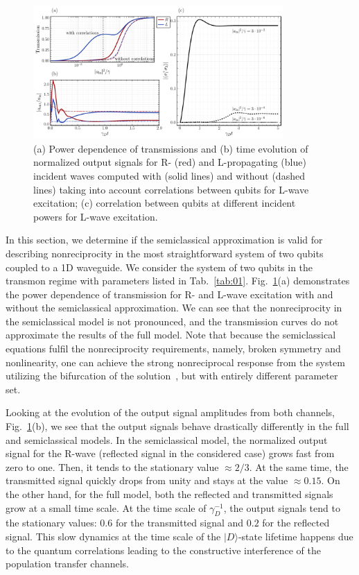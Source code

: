 \documentclass[lettersize,journal]{IEEEtran}
\begin{document}
\begin{figure}[t]
    \centering
    \includegraphics[width=0.85\textwidth]{fig_6}
    \caption{(a) Power dependence of transmissions and (b) time evolution of normalized output signals for R- (red) and L-propagating (blue) incident waves computed with (solid lines) and without (dashed lines) taking into account correlations between qubits for L-wave excitation; (c) correlation between qubits at different incident powers for L-wave excitation.}
    \label{fig:07}
\end{figure}
In this section, we determine if the semiclassical approximation is valid for describing nonreciprocity in the most straightforward system of two qubits coupled to a 1D waveguide.
We consider the system of two qubits in the transmon regime with parameters listed in Tab.~\ref{tab:01}.
Fig.~\ref{fig:07}(a) demonstrates the power dependence of transmission for R- and L-wave excitation with and without the semiclassical approximation.
We can see that the nonreciprocity in the semiclassical model is not pronounced, and the transmission curves do not approximate the results of the full model.
Note that because the semiclassical equations fulfil the nonreciprocity requirements, namely, broken symmetry and nonlinearity, one can achieve the strong nonreciprocal response from the system utilizing the bifurcation of the solution~\cite{cotrufo2021nonlinearity1, cotrufo2021nonlinearity2}, but with entirely different parameter set.

Looking at the evolution of the output signal amplitudes from both channels, Fig.~\ref{fig:07}(b), we see that the output signals behave drastically differently in the full and semiclassical models.
In the semiclassical model, the normalized output signal for the R-wave (reflected signal in the considered case) grows fast from zero to one. 
Then, it tends to the stationary value $\approx 2/3$.
At the same time, the transmitted signal quickly drops from unity and stays at the value $\approx 0.15$.
On the other hand, for the full model, both the reflected and transmitted signals grow at a small time scale.
At the time scale of $\gamma_D^{-1}$, the output signals tend to the stationary values: $0.6$ for the transmitted signal and $0.2$ for the reflected signal.
This slow dynamics at the time scale of the $|D\rangle$-state lifetime happens due to the quantum correlations leading to the constructive interference of the population transfer channels.
\end{document}
